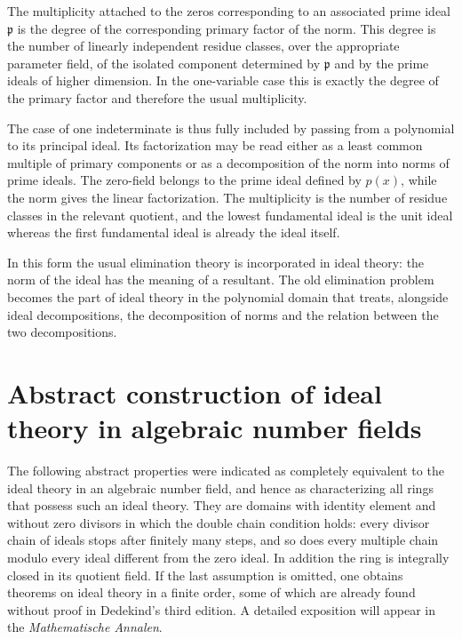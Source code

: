 \documentclass[11pt]{article}
\begin{document}
The multiplicity attached to the zeros corresponding to an associated prime ideal $\mathfrak p$ is the degree of the corresponding primary factor of the norm. This degree is the number of linearly independent residue classes, over the appropriate parameter field, of the isolated component determined by $\mathfrak p$ and by the prime ideals of higher dimension. In the one-variable case this is exactly the degree of the primary factor and therefore the usual multiplicity.

The case of one indeterminate is thus fully included by passing from a polynomial to its principal ideal. Its factorization may be read either as a least common multiple of primary components or as a decomposition of the norm into norms of prime ideals. The zero-field belongs to the prime ideal defined by $p(x)$, while the norm gives the linear factorization. The multiplicity is the number of residue classes in the relevant quotient, and the lowest fundamental ideal is the unit ideal whereas the first fundamental ideal is already the ideal itself.

In this form the usual elimination theory is incorporated in ideal theory: the norm of the ideal has the meaning of a resultant. The old elimination problem becomes the part of ideal theory in the polynomial domain that treats, alongside ideal decompositions, the decomposition of norms and the relation between the two decompositions.

\newpage

\section{Abstract construction of ideal theory in algebraic number fields}

The following abstract properties were indicated as completely equivalent to the ideal theory in an algebraic number field, and hence as characterizing all rings that possess such an ideal theory. They are domains with identity element and without zero divisors in which the double chain condition holds: every divisor chain of ideals stops after finitely many steps, and so does every multiple chain modulo every ideal different from the zero ideal. In addition the ring is integrally closed in its quotient field. If the last assumption is omitted, one obtains theorems on ideal theory in a finite order, some of which are already found without proof in Dedekind's third edition. A detailed exposition will appear in the \emph{Mathematische Annalen}.
\end{document}
